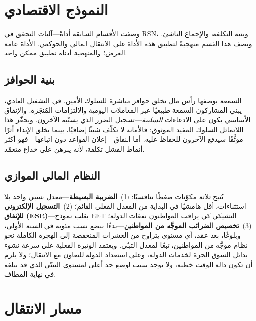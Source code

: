 \documentclass[11pt,a4paper,twocolumn]{article}
\begin{document}
\section{النموذج الاقتصادي}

وصفت الأقسام السابقة أداةً---آليات التحقق في RSN، وبنية التكلفة، والإجماع الناشئ. ويصف هذا القسم منهجيةً لتطبيق هذه الأداة على الانتقال المالي والحوكمي. الأداة عامة الغرض؛ والمنهجية أدناه تطبيق ممكن واحد.

\subsection{بنية الحوافز}

السمعة بوصفها رأس مال تخلق حوافز مباشرة للسلوك الأمين. في التشغيل العادي، يبني المشاركون السمعة طبيعيًا عبر المعاملات اليومية والالتزامات المُنجَزة. والإنفاق الأساسي يكون على الادعاءات \emph{السلبية}---تسجيل الضرر الذي يسبّبه الآخرون. ويحفّز هذا اللاتماثل السلوك المفيد الموثوق: فالأمانة لا تكلّف شيئًا إضافيًا، بينما يخلق الإيذاء أثرًا موثَّقًا سيدفع الآخرون للحفاظ عليه. أما النفاق---إعلان القواعد دون اتباعها---فهو أكثر أنماط الفشل تكلفة، لأنه يبرهن على خداع متعمّد.

\subsection{النظام المالي الموازي}

تُتيح ثلاثة مكوّنات ضغطًا تنافسيًا: (1)~\textbf{الضريبة البسيطة}---معدل نسبي واحد بلا استثناءات، أقل هامشيًا في البداية من المعدل الفعلي القائم؛ (2)~\textbf{التسجيل الإلكتروني للإنفاق (ESR)}---بقلب نموذج EET التشيكي كي يراقب المواطنون نفقات الدولة؛ (3)~\textbf{تخصيص الضرائب الموجَّه من المواطنين}---بدءًا ببضع نسب مئوية في السنة الأولى، وبلوغًا، بعد عقد، أي مستوى يتراوح من العشرات المنخفضة إلى الهجرة الكاملة نحو نظام موجَّه من المواطنين، تبعًا لمعدل التبنّي. ويعتمد الوتيرة الفعلية على سرعة نشوء بدائل السوق الحرة لخدمات الدولة، وعلى استعداد الدولة للتعاون مع الانتقال؛ ولا يلزم أن تكون دالة الوقت خطية، ولا يوجد سبب لوضع حد أعلى لمستوى التبنّي الذي قد يبلغه في نهاية المطاف.

\section{مسار الانتقال}
\end{document}
